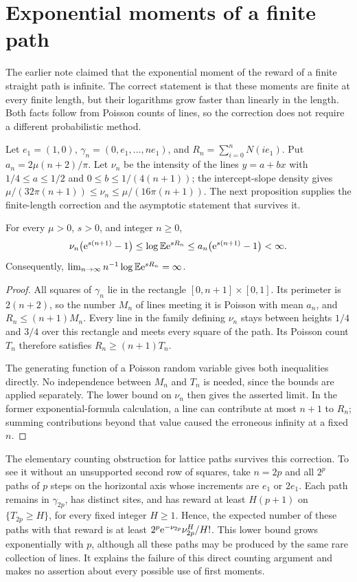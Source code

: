 \documentclass[11pt,letterpaper]{article}
\begin{document}
\section{Exponential moments of a finite path}

The earlier note claimed that the exponential moment of the reward of a finite straight path is infinite. The correct statement is that these moments are finite at every finite length, but their logarithms grow faster than linearly in the length. Both facts follow from Poisson counts of lines, so the correction does not require a different probabilistic method.

Let $e_1=(1,0)$, $\gamma_n=(0,e_1,\ldots,ne_1)$, and $R_n=\sum_{i=0}^nN(ie_1)$. Put $a_n=2\mu(n+2)/\pi$. Let $\nu_n$ be the intensity of the lines $y=a+bx$ with $1/4\le a\le1/2$ and $0\le b\le1/(4(n+1))$; the intercept-slope density gives $\mu/(32\pi(n+1))\le\nu_n\le\mu/(16\pi(n+1))$. The next proposition supplies the finite-length correction and the asymptotic statement that survives it.

\begin{proposition}\label{prop:moments}
For every $\mu>0$, $s>0$, and integer $n\ge0$,
\[
 \nu_n\big(\mathrm{e}^{s(n+1)}-1\big)
 \le\log\mathbb E\mathrm{e}^{sR_n}
 \le a_n\big(\mathrm{e}^{s(n+1)}-1\big)<\infty.
\]
Consequently, $\lim_{n\to\infty}n^{-1}\log\mathbb E\mathrm{e}^{sR_n}=\infty$.
\end{proposition}

\begin{proof}
All squares of $\gamma_n$ lie in the rectangle $[0,n+1]\times[0,1]$. Its perimeter is $2(n+2)$, so the number $M_n$ of lines meeting it is Poisson with mean $a_n$, and $R_n\le(n+1)M_n$. Every line in the family defining $\nu_n$ stays between heights $1/4$ and $3/4$ over this rectangle and meets every square of the path. Its Poisson count $T_n$ therefore satisfies $R_n\ge(n+1)T_n$.

The generating function of a Poisson random variable gives both inequalities directly. No independence between $M_n$ and $T_n$ is needed, since the bounds are applied separately. The lower bound on $\nu_n$ then gives the asserted limit. In the former exponential-formula calculation, a line can contribute at most $n+1$ to $R_n$; summing contributions beyond that value caused the erroneous infinity at a fixed $n$.
\end{proof}

The elementary counting obstruction for lattice paths survives this correction. To see it without an unsupported second row of squares, take $n=2p$ and all $2^p$ paths of $p$ steps on the horizontal axis whose increments are $e_1$ or $2e_1$. Each path remains in $\gamma_{2p}$, has distinct sites, and has reward at least $H(p+1)$ on $\{T_{2p}\ge H\}$, for every fixed integer $H\ge1$. Hence, the expected number of these paths with that reward is at least $2^p\mathrm{e}^{-\nu_{2p}}\nu_{2p}^H/H!$. This lower bound grows exponentially with $p$, although all these paths may be produced by the same rare collection of lines. It explains the failure of this direct counting argument and makes no assertion about every possible use of first moments.
\end{document}
